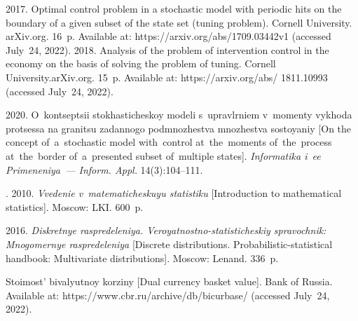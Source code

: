   \begin{multicols}{2}

\renewcommand{\bibname}{\protect\rmfamily References}

{\small\frenchspacing
 {%
 \begin{thebibliography}{9}
 
 \vspace*{-4pt}

 2017. Optimal control problem in a stochastic model with periodic hits on the 
boundary of a given subset of the state set (tuning problem). Cornell University. arXiv.org. 16~p. Available at: {\sf 
https://arxiv.org/\linebreak  abs/1709.03442v1} (accessed July~24, 2022).
 2018. Analysis of the problem of intervention control in the 
economy on the basis of solving the problem of tuning. Cornell University.\linebreak arXiv.org. 15~p. Available at: {\sf 
https://arxiv.org/abs/ 1811.10993} (accessed July~24, 2022). 

    2020. O~kontseptsii sto\-kha\-sti\-che\-skoy modeli 
s~upravlrniem v~momenty vykhoda pro\-tses\-sa na granitsu zadannogo podmnozhestva mno\-zhe\-st\-va 
sostoyaniy [On the concept of~a~stochastic model with~control at~the~moments of~the~process 
at~the~border of~a~presented subset of~multiple states]. \textit{Informatika i~ee Primeneniya~--- 
Inform. Appl.} 14(3):104--111.


  
. 2010. \textit{Vvedenie v~matematicheskuyu statistiku} 
[Introduction to mathematical statistics]. Moscow: LKI. 600~p.

 2016. \textit{Diskretnye raspredeleniya.  
Veroyatnostno-statisticheskiy spra\-voch\-nik: Mnogomernye raspredeleniya} [Discrete distributions. 
Probabilistic-statistical handbook: Multivariate distributions]. Moscow: Lenand. 336~p.

Stoimost' bivalyutnoy korziny [Dual currency basket value]. Bank of Russia. Available at:  {\sf 
https://www.cbr.ru/\linebreak archive/db/bicurbase/} (accessed July~24, 2022).
\end{thebibliography}

 }
 }

\end{multicols}

